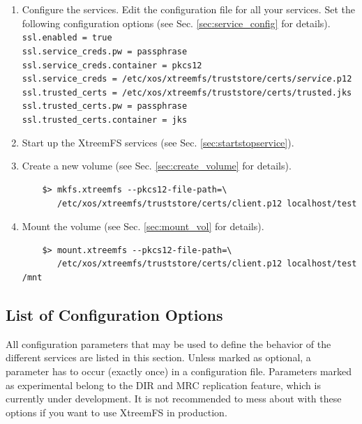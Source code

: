 \documentclass[a4paper,10pt]{book}
\begin{document}
\begin{enumerate}
 \item Configure the services.
	Edit the configuration file for all your services. Set the following configuration options (see Sec. \ref{sec:service_config} for details).\\
	\texttt{ssl.enabled = true}\\
	\texttt{ssl.service\_creds.pw = passphrase}\\
	\texttt{ssl.service\_creds.container = pkcs12}\\
	\texttt{ssl.service\_creds = /etc/xos/xtreemfs/truststore/certs/\textit{service}.p12}\\
	\texttt{ssl.trusted\_certs = /etc/xos/xtreemfs/truststore/certs/trusted.jks}\\
	\texttt{ssl.trusted\_certs.pw = passphrase}\\
	\texttt{ssl.trusted\_certs.container = jks}
 \item Start up the XtreemFS services (see Sec. \ref{sec:startstopservice}).
 \item Create a new volume (see Sec. \ref{sec:create_volume} for details).
	\begin{verbatim}
	$> mkfs.xtreemfs --pkcs12-file-path=\
	   /etc/xos/xtreemfs/truststore/certs/client.p12 localhost/test
	\end{verbatim}

 \item Mount the volume (see Sec. \ref{sec:mount_vol} for details).
	\begin{verbatim}
	$> mount.xtreemfs --pkcs12-file-path=\
	   /etc/xos/xtreemfs/truststore/certs/client.p12 localhost/test /mnt
	\end{verbatim}

\end{enumerate}


\subsection{List of Configuration Options}
\label{sec:config}

All configuration parameters that may be used to define the behavior of the different services are listed in this section. Unless marked as optional, a parameter has to occur (exactly once) in a configuration file. Parameters marked as experimental belong to the DIR and MRC replication feature, which is currently under development. It is not recommended to mess about with these options if you want to use XtreemFS in production. 

\end{document}
